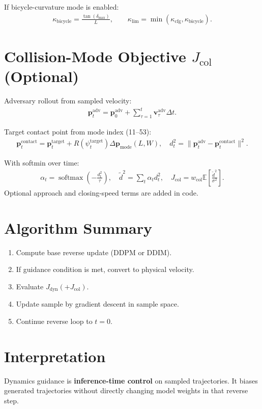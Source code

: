\documentclass[11pt,a4paper]{article}
\begin{document}
If bicycle-curvature mode is enabled:
\begin{align}
\kappa_{\text{bicycle}} = \frac{\tan(\delta_{\max})}{L},\qquad
\kappa_{\lim} = \min(\kappa_{\text{cfg}},\kappa_{\text{bicycle}}).
\end{align}

\section{Collision-Mode Objective $J_{\text{col}}$ (Optional)}
Adversary rollout from sampled velocity:
\begin{align}
\bm{p}^{\text{adv}}_t
=
\bm{p}^{\text{adv}}_0+\sum_{\tau=1}^{t}\bm{v}^{\text{adv}}_{\tau}\Delta t.
\end{align}

Target contact point from mode index (11--53):
\begin{align}
\bm{p}^{\text{contact}}_t
=
\bm{p}^{\text{target}}_t
+R(\psi^{\text{target}}_t)\Delta\bm{p}_{\text{mode}}(L,W),\quad
d_t^2=\|\bm{p}^{\text{adv}}_t-\bm{p}^{\text{contact}}_t\|^2.
\end{align}

With softmin over time:
\begin{align}
\alpha_t = \operatorname{softmax}\!\left(-\frac{d_t^2}{\tau}\right),\quad
\tilde{d}^2=\sum_t \alpha_t d_t^2,\quad
J_{\text{col}} = w_{\text{col}}\mathbb{E}\!\left[\frac{\tilde{d}^2}{\sigma^2}\right].
\end{align}
Optional approach and closing-speed terms are added in code.

\section{Algorithm Summary}
\begin{enumerate}
\item Compute base reverse update (DDPM or DDIM).
\item If guidance condition is met, convert to physical velocity.
\item Evaluate $J_{\text{dyn}}(+J_{\text{col}})$.
\item Update sample by gradient descent in sample space.
\item Continue reverse loop to $t=0$.
\end{enumerate}

\section{Interpretation}
Dynamics guidance is \textbf{inference-time control} on sampled trajectories.
It biases generated trajectories without directly changing model weights in that reverse step.
\end{document}

